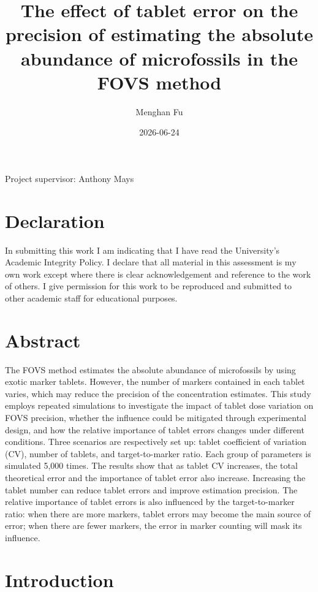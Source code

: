 \documentclass[
  12pt,
]{article}
\title{\textbf{The effect of tablet error on the precision of estimating
the absolute abundance of microfossils in the FOVS method}}
\author{Menghan Fu}
\date{2026-06-24}
\begin{document}
\maketitle

\newtheorem{theorem}{Theorem}

Project supervisor: Anthony Mays

\section{Declaration}\label{declaration}

In submitting this work I am indicating that I have read the
University's Academic Integrity Policy. I declare that all material in
this assessment is my own work except where there is clear
acknowledgement and reference to the work of others. I give permission
for this work to be reproduced and submitted to other academic staff for
educational purposes.

\section{Abstract}\label{abstract}

The FOVS method estimates the absolute abundance of microfossils by
using exotic marker tablets. However, the number of markers contained in
each tablet varies, which may reduce the precision of the concentration
estimates. This study employs repeated simulations to investigate the
impact of tablet dose variation on FOVS precision, whether the influence
could be mitigated through experimental design, and how the relative
importance of tablet errors changes under different conditions. Three
scenarios are respectively set up: tablet coefficient of variation (CV),
number of tablets, and target-to-marker ratio. Each group of parameters
is simulated 5,000 times. The results show that as tablet CV increases,
the total theoretical error and the importance of tablet error also
increase. Increasing the tablet number can reduce tablet errors and
improve estimation precision. The relative importance of tablet errors
is also influenced by the target-to-marker ratio: when there are more
markers, tablet errors may become the main source of error; when there
are fewer markers, the error in marker counting will mask its influence.

\section{Introduction}\label{introduction}
\end{document}
